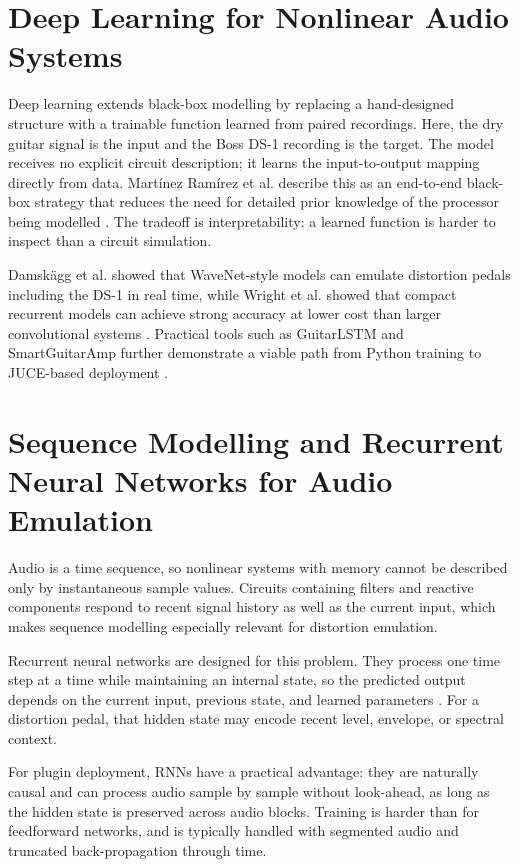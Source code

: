 \section{Deep Learning for Nonlinear Audio Systems}

Deep learning extends black-box modelling by replacing a hand-designed structure with a trainable function learned from paired recordings. Here, the dry guitar signal is the input and the Boss DS-1 recording is the target. The model receives no explicit circuit description; it learns the input-to-output mapping directly from data. Martínez Ramírez et al. describe this as an end-to-end black-box strategy that reduces the need for detailed prior knowledge of the processor being modelled \cite{martinez_ramirez_deep_2020}. The tradeoff is interpretability: a learned function is harder to inspect than a circuit simulation.

Damskägg et al. showed that WaveNet-style models can emulate distortion pedals including the DS-1 in real time, while Wright et al. showed that compact recurrent models can achieve strong accuracy at lower cost than larger convolutional systems \cite{wright_real-time_2019}. Practical tools such as GuitarLSTM and SmartGuitarAmp further demonstrate a viable path from Python training to JUCE-based deployment \cite{GuitarML_GuitarLSTM,GuitarML_SmartGuitarAmp}.

\section{Sequence Modelling and Recurrent Neural Networks for Audio Emulation}

Audio is a time sequence, so nonlinear systems with memory cannot be described only by instantaneous sample values. Circuits containing filters and reactive components respond to recent signal history as well as the current input, which makes sequence modelling especially relevant for distortion emulation.

Recurrent neural networks are designed for this problem. They process one time step at a time while maintaining an internal state, so the predicted output depends on the current input, previous state, and learned parameters \cite{wright_real-time_2019}. For a distortion pedal, that hidden state may encode recent level, envelope, or spectral context.

For plugin deployment, RNNs have a practical advantage: they are naturally causal and can process audio sample by sample without look-ahead, as long as the hidden state is preserved across audio blocks. Training is harder than for feedforward networks, and is typically handled with segmented audio and truncated back-propagation through time.

